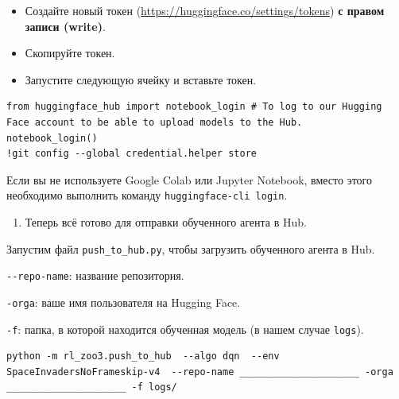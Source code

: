 \documentclass[11pt,a4paper]{article}
\begin{document}
\begin{itemize}
\tightlist
\item
Создайте новый токен (\url{https://huggingface.co/settings/tokens}) \textbf{с правом записи (write)}.
\end{itemize}


\begin{itemize}
\tightlist
\item
Скопируйте токен.
\item
Запустите следующую ячейку и вставьте токен.
\end{itemize}

\begin{lstlisting}
from huggingface_hub import notebook_login # To log to our Hugging Face account to be able to upload models to the Hub.
notebook_login()
!git config --global credential.helper store
\end{lstlisting}

Если вы не используете Google Colab или Jupyter Notebook, вместо этого необходимо выполнить команду \texttt{huggingface-cli\ login}.

\begin{enumerate}
\def\labelenumi{\arabic{enumi}.}
\setcounter{enumi}{2}
\tightlist
\item
Теперь всё готово для отправки обученного агента в Hub.
\end{enumerate}

Запустим файл \texttt{push\_to\_hub.py}, чтобы загрузить обученного агента в Hub.

\texttt{-{}-repo-name}: название репозитория.

\texttt{-orga}: ваше имя пользователя на Hugging Face.

\texttt{-f}: папка, в которой находится обученная модель (в нашем случае \texttt{logs}).


\begin{lstlisting}
python -m rl_zoo3.push_to_hub  --algo dqn  --env SpaceInvadersNoFrameskip-v4  --repo-name _____________________ -orga _____________________ -f logs/
\end{lstlisting}
\end{document}
